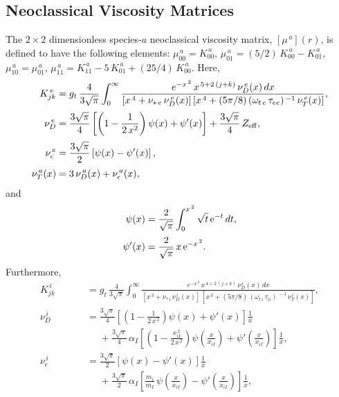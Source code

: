 \documentclass[notitlepage,12pt]{article}
\begin{document}
\subsection{Neoclassical Viscosity Matrices}\label{vmatrix}
The $2\times 2$ dimensionless species-$a$ neoclassical viscosity matrix, $[\mu^{\,a}](r)$,  is defined to have the following elements:
$\mu_{00}^{\,a} = K_{00}^{\,a}$, $\mu_{01}^{\,a}= (5/2)\,K_{00}^{\,a}- K_{01}^{\,a}$,
$\mu_{10}^{\,a}= \mu_{01}^{\,a}$,
$\mu_{11}^{\,a} = K_{11}^{\,a} - 5\,K_{01}^{\,a}+(25/4)\,K_{00}^{\,a}$.
Here,
\begin{align}
 K_{jk}^{\,e} &= g_t\,\frac{4}{3\sqrt{\pi}}\int_0^\infty
\frac{e^{-x^{\,2}}\,x^{\,5+2\,(j+k)}\,\nu_D^{\,e}(x)\,dx}{[x^{\,4}+\nu_{\ast\,e}\,\nu_D^{\,e}(x)]\,[x^{\,4}+(5\pi/8)\,(\omega_{t\,e}\,\tau_{ee})^{\,-1}\,\nu_T^{\,e}(x)]},\\[0.5ex]
\nu_D^{\,e}&= \frac{3\sqrt{\pi}}{4}\left[\left(1-\frac{1}{2\,x^2}\right)\psi(x)+\psi'(x)\right]+\frac{3\sqrt{\pi}}{4}\,Z_{\rm eff},\\[0.5ex]
\nu_\epsilon^{\,e}&= \frac{3\sqrt{\pi}}{2}\left[\psi(x)-\psi'(x)\right],\\[0.5ex]
\nu_T^{\,a}(x) &= 3\,\nu_D^{\,a}(x)+\nu_{\epsilon}^{\,a}(x),
\end{align}
and
\begin{align}
\psi(x) &= \frac{2}{\sqrt{\pi}}\int_0^{x^{\,2}}\sqrt{t}\,{\rm e}^{-t}\,dt,\\[0.5ex]
\psi'(x)&= \frac{2}{\sqrt{\pi}}\,x\,{\rm e}^{-x^{\,2}}.
\end{align}
Furthermore, 
\begin{align}
 K_{jk}^{\,i} &=g_t\,\frac{4}{3\sqrt{\pi}}\int_0^\infty
\frac{e^{-x^{\,2}}\,x^{\,4+2\,(j+k)}\,\nu_D^{\,i}(x)\,dx}{[x^{\,3}+\nu_{\ast\,i}\,\nu_D^{\,i}(x)]\,[x^{\,3}+(5\pi/8)\,(\omega_{t\,i}\,\tau_{ii})^{\,-1}\,\nu_T^{\,i}(x)]},\\[0.5ex]
 \nu_D^{\,i}&= \frac{3\sqrt{\pi}}{4}\left[\left(1-\frac{1}{2\,x^{\,2}}\right)\psi(x)+\psi'(x)\right]\frac{1}{x}\nonumber\\[0.5ex]\phantom{===}
&\phantom{=}+\frac{3\sqrt{\pi}}{4}\,\alpha_I\left[\left(1-\frac{x_{iI}^{\,2}}{2\,x^{\,2}}\right)\psi\!\left(\frac{x}{x_{iI}}\right)
+\psi'\!\left(\frac{x}{x_{iI}}\right)\right]\frac{1}{x},\\[0.5ex]
 \nu_\epsilon^{\,i}&=\frac{3\sqrt{\pi}}{2}\left[\psi(x)-\psi'(x)\right]\frac{1}{x}\nonumber\\[0.5ex]\phantom{===}
&\phantom{=}+\frac{3\sqrt{\pi}}{2}\,\alpha_I\left[\frac{m_i}{m_I}\,\psi\!\left(\frac{x}{x_{iI}}\right)
-\psi'\!\left(\frac{x}{x_{iI}}\right)\right]\frac{1}{x},
\end{align}
\end{document}
